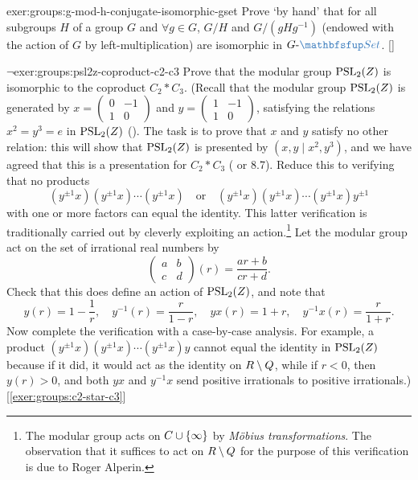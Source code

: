\begin{exer}{\exerused}{exer:groups:g-mod-h-conjugate-isomorphic-gset}
  Prove `by hand' that for all subgroups $H$ of a group $G$ and
  $\forall g \in G$, $G/H$ and $G/(gHg^{-1})$ (endowed with the action
  of $G$ by left-multiplication) are isomorphic in
  $G\text{-}\categ{Set}$. []
\end{exer}
\begin{exer}{$\lnot$}{exer:groups:psl2z-coproduct-c2-c3}
  Prove that the modular group $\mathrm{PSL}_2(Z)$ is isomorphic to
  the coproduct $C_2 * C_3$. (Recall that the modular group
  $\mathrm{PSL}_2(Z)$ is generated by
  $x = \begin{pmatrix} 0 & -1 \\ 1 & 0 \end{pmatrix}$ and
  $y = \begin{pmatrix} 1 & -1 \\ 1 & 0 \end{pmatrix}$, satisfying the
  relations $x^2 = y^3 = e$ in $\mathrm{PSL}_2(Z)$
  (). The task is to prove that
  $x$ and $y$ satisfy no other relation: this will show that
  $\mathrm{PSL}_2(Z)$ is presented by $(x,y \mid x^2, y^3)$, and we
  have agreed that this is a presentation for $C_2 * C_3$
  ( or 8.7). Reduce this to verifying
  that no products
  \[
    (y^{\pm 1}x)(y^{\pm 1}x) \cdots (y^{\pm 1}x) \quad \text{or} \quad
    (y^{\pm 1}x)(y^{\pm 1}x) \cdots (y^{\pm 1}x)y^{\pm 1}
  \]
  with one or more factors can equal the identity. This latter
  verification is traditionally carried out by cleverly exploiting an
  action.\footnote{The modular group acts on $C \cup \{\infty\}$ by
    \emph{M\"obius transformations}. The observation that it suffices
    to act on $R \mathbin{\backslash} Q$ for the purpose of this verification
    is due to Roger Alperin.} Let the modular group act on the set of
  irrational real numbers by
  \[
    \begin{pmatrix} a & b \\ c & d \end{pmatrix}(r) =
    \frac{ar+b}{cr+d}.
  \]
  Check that this does define an action of $\mathrm{PSL}_2(Z)$, and
  note that
  \[
    y(r) = 1 - \frac{1}{r}, \quad y^{-1}(r) = \frac{r}{1-r}, \quad
    yx(r) = 1+r, \quad y^{-1}x(r) = \frac{r}{1+r}.
  \]
  Now complete the verification with a case-by-case analysis. For
  example, a product $(y^{\pm 1}x)(y^{\pm 1}x) \cdots (y^{\pm 1}x)y$
  cannot equal the identity in $\mathrm{PSL}_2(Z)$ because if it did,
  it would act as the identity on $R \mathbin{\backslash} Q$, while if $r < 0$,
  then $y(r) > 0$, and both $yx$ and $y^{-1}x$ send positive
  irrationals to positive irrationals.) [\ref{exer:groups:c2-star-c3}]
\end{exer}
